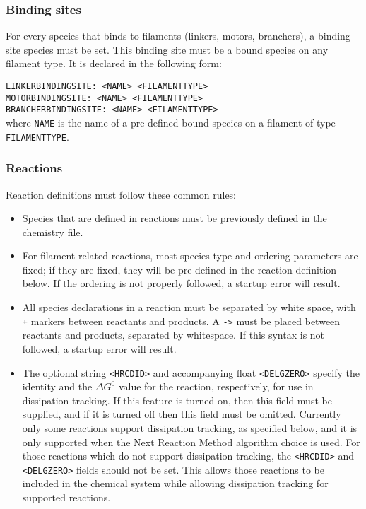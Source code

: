 \documentclass[11pt, oneside]{article}   	%
\begin{document}
\begin{itemize}
\end{itemize}

\subsubsection{Binding sites}

For every species that binds to filaments (linkers, motors, branchers), a binding site species must be set. This binding site must be a bound species on any filament type. It is declared in the following form: \newline

\noindent\texttt{LINKERBINDINGSITE: <NAME> <FILAMENTTYPE>}\\
\texttt{MOTORBINDINGSITE: <NAME> <FILAMENTTYPE>}\\
\texttt{BRANCHERBINDINGSITE: <NAME> <FILAMENTTYPE>}\\

\noindent where \texttt{NAME} is the name of a pre-defined bound species on a filament of type \texttt{FILAMENTTYPE}.

\subsubsection{Reactions}

Reaction definitions must follow these common rules:
\begin{itemize}
\item Species that are defined in reactions must be previously defined in the chemistry file. 
\item For filament-related reactions, most species type and ordering parameters are fixed; if they are fixed, they will be pre-defined in the reaction definition below. If the ordering is not properly followed, a startup error will result. 
\item All species declarations in a reaction must be separated by white space, with \texttt{+} markers between reactants and products. A \texttt{->} must be placed between reactants and products, separated by whitespace. If this syntax is not followed, a startup error will result.
\item The optional string \texttt{<HRCDID>} and accompanying float \texttt{<DELGZERO>} specify the identity and the $\Delta G^0$ value for the reaction, respectively, for use in dissipation tracking.  If this feature is turned on, then this field must be supplied, and if it is turned off then this field must be omitted.  Currently only some reactions support dissipation tracking, as specified below, and it is only supported when the Next Reaction Method algorithm choice is used.  For those reactions which do not support dissipation tracking, the \texttt{<HRCDID>} and \texttt{<DELGZERO>} fields should not be set.  This allows those reactions to be included in the chemical system while allowing dissipation tracking for supported reactions. 
\end{itemize}
\end{document}

